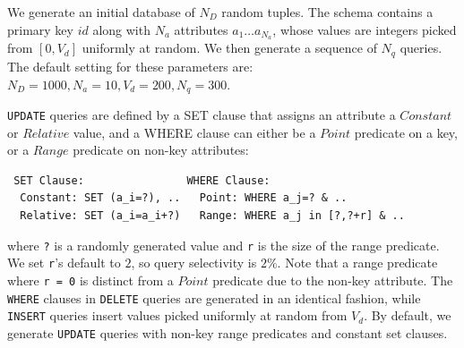 
 \label{sec:syntheticgen}
We generate an initial database of $N_D$ random tuples.  
The schema contains a primary key $id$ along with $N_a$ attributes $a_1\ldots a_{N_a}$, whose values are integers picked from $[0, V_d]$ uniformly at random.
We then generate a sequence of $N_q$ queries.
The default setting for these parameters are: $N_D = 1000, N_a = 10, V_d = 200, N_q = 300$.


\noindent \texttt{UPDATE} queries are defined by a SET clause that assigns an attribute a $Constant$ or $Relative$ value,
and a WHERE clause can either be a $Point$ predicate on a key, or a $Range$ predicate on non-key attributes:
{\scriptsize
\begin{verbatim}
 SET Clause:                WHERE Clause:
  Constant: SET (a_i=?), ..   Point: WHERE a_j=? & ..
  Relative: SET (a_i=a_i+?)   Range: WHERE a_j in [?,?+r] & ..\end{verbatim} }
where \verb|?| is a randomly generated value and \verb|r| is the size of the range predicate. 
We set \verb|r|'s default to $2$, so query selectivity is $2\%$.
Note that a range predicate where \texttt{r = 0} is distinct from a $Point$ predicate due to the non-key attribute.
The \texttt{WHERE} clauses in \texttt{DELETE} queries are generated in an identical fashion, while
\texttt{INSERT} queries insert values picked uniformly at random from $V_d$.
By default, we generate \texttt{UPDATE} queries with non-key range predicates and constant set clauses.

% 

